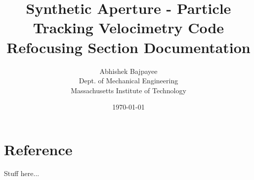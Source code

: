 \documentclass[11pt]{article}
\newcommand{\mytitle}{Synthetic Aperture - Particle Tracking Velocimetry Code
		    \\Refocusing Section Documentation}
\begin{document}
\pagestyle{plain}


\title{\mytitle}
\author{Abhishek Bajpayee
\\Dept. of Mechanical Engineering
\\Massachusetts Institute of Technology}
\date{\today}


\maketitle





\section{Reference}

Stuff here...

\end{document}
